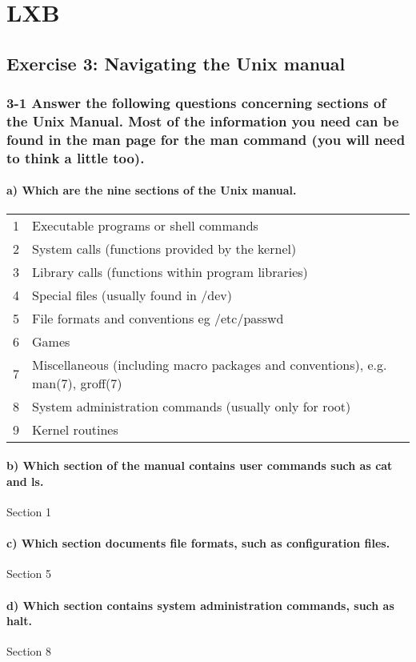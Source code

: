 
\chapter{LXB}
\section{Exercise 3: Navigating the Unix manual}
\subsection{3-1 Answer the following questions concerning sections of the Unix Manual. Most of the information you need can be found in the man page for the man command (you will need to think a little too).}
\subsubsection{a) Which are the nine sections of the Unix manual.}
\begin{tabular}{ll}
1&   Executable programs or shell commands\\
2&   System calls (functions provided by the kernel)\\
3&   Library calls (functions within program libraries)\\
4&   Special files (usually found in /dev)\\
5&   File formats and conventions eg /etc/passwd\\
6&   Games\\
7&   Miscellaneous (including macro packages and conventions), e.g. man(7), groff(7)\\
8&   System administration commands (usually only for root)\\
9&   Kernel routines
\end{tabular}

\subsubsection{b) Which section of the manual contains user commands such as cat and ls.}
Section 1

\subsubsection{c) Which section documents file formats, such as configuration files.}
Section 5

\subsubsection{d) Which section contains system administration commands, such as halt.}
Section 8
